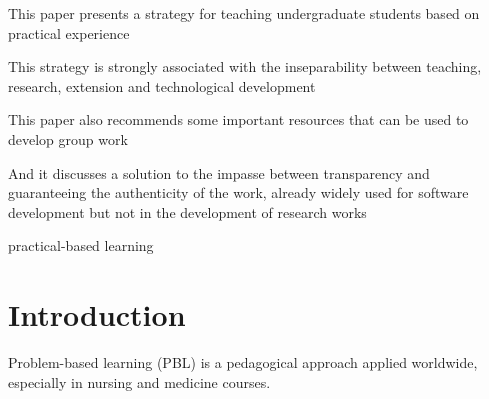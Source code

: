 \documentclass[preprint,12pt,authoryear]{elsarticle}
\begin{document}
\begin{frontmatter}
\begin{highlights}
\item This paper presents a strategy for teaching undergraduate students based on practical experience
\item This strategy is strongly associated with the inseparability between teaching, research, extension and technological development
\item This paper also recommends some important resources that can be used to develop group work
\item And it discusses a solution to the impasse between transparency and guaranteeing the authenticity of the work, already widely used for software development but not in the development of research works
\end{highlights}

\begin{keyword}
practical-based learning



\end{keyword}

\end{frontmatter}



\section{Introduction}
\label{}

Problem-based learning (PBL) is a pedagogical approach applied worldwide, especially in nursing and medicine courses. 

\section{}
\label{}
\end{document}
